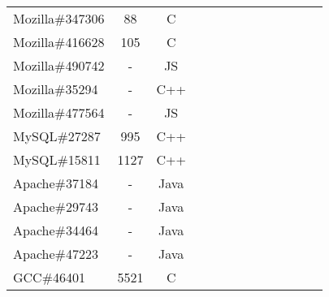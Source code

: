 \begin{table}[h!]
\begin{tabular}{lcccccccccccc}
    Mozilla\#347306              &  88  & C  &  &              &    &                                 &                   &                           &                                \\
    Mozilla\#416628              &  105  & C  &  &              &    &                                 &                   &                           &                               \\
    Mozilla\#490742                  &  -  & JS  &  &              &    &                                 &                   &                           &                                \\
    Mozilla\#35294    &  -  & C++  &  &              &    &                                 &                   &                           &                               \\
    Mozilla\#477564   &  -  & JS  &  &              &    &                                 &                   &                           &                                \\
    \midrule
    MySQL\#27287      &  995  & C++  &  &              &    &                                 &                   &                           &                                \\
    MySQL\#15811      &  1127 & C++  &  &              &    &                                 &                   &                           &                                \\
    \midrule
    Apache\#37184     &  -  & Java  &  &              &    &                                 &                   &                           &                               \\ 
    Apache\#29743     &  -  & Java  &  &              &    &                                 &                   &                           &                              \\
    Apache\#34464     &  -  & Java  &  &              &    &                                 &                   &                           &                               \\
    Apache\#47223     &  -  & Java  &  &              &    &                                 &                   &                           &                               \\
    \midrule
    GCC\#46401        &  5521  & C  &  &              &    &                                 &                   &                           &                                \\

\end{tabular}
\end{table}
